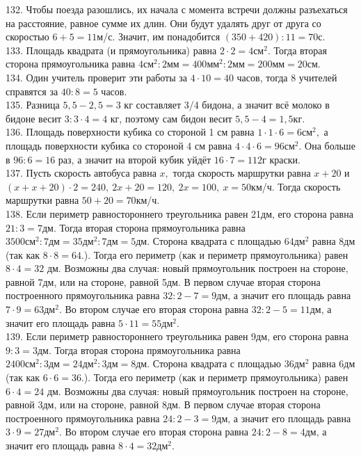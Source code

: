 \documentclass[12pt]{article}
\begin{document}
132. Чтобы поезда разошлись, их начала с момента встречи должны разъехаться на расстояние, равное сумме их длин. Они будут удалять друг от друга со скоростью $6+5=11$м/с. Значит, им понадобится $(350+420):11=70$с.\\
133. Площадь квадрата (и прямоугольника) равна $2\cdot2=4\text{см}^2.$ Тогда вторая сторона прямоугольника равна $4\text{см}^2:2\text{мм}=400\text{мм}^2:2\text{мм}=
200\text{мм}=20$см.\\
134. Один учитель проверит эти работы за $4\cdot10=40$ часов, тогда 8 учителей справятся за $40:8=5$ часов.\\
135. Разница $5,5-2,5=3$ кг составляет 3/4 бидона, а значит всё молоко в бидоне весит $3:3\cdot4=4$ кг, поэтому сам бидон весит $5,5-4=1,5$кг.\\
136. Площадь поверхности кубика со стороной 1 см равна $1\cdot1\cdot6=6\text{см}^2,$ а площадь поверхности кубика со стороной 4 см равна $4\cdot4\cdot6=96\text{см}^2.$ Она больше в $96:6=16$ раз, а значит на второй кубик уйдёт $16\cdot7=112$г краски.\\
137. Пусть скорость автобуса равна $x,$ тогда скорость маршрутки равна $x+20$ и $(x+x+20)\cdot2=240,\ 2x+20=120,\ 2x=100,\ x=50$км/ч. Тогда скорость маршрутки равна $50+20=70$км/ч.\\
138. Если периметр равностороннего треугольника равен 21дм, его сторона равна $21:3=7\text{дм}.$ Тогда вторая сторона прямоугольника равна $3500\text{см}^2:7\text{дм}=35\text{дм}^2:7\text{дм}=5\text{дм}$. Сторона квадрата с площадью $64\text{дм}^2$ равна 8дм (так как $8\cdot8=64.$). Тогда его периметр (как и периметр прямоугольника) равен $8\cdot4=32$ дм. Возможны два случая: новый прямоугольник построен на стороне, равной 7дм, или на стороне, равной 5дм. В первом случае вторая сторона построенного прямоугольника равна $32:2-7=9$дм, а значит его площадь равна $7\cdot9=63\text{дм}^2.$ Во втором случае его вторая сторона равна $32:2-5=11$дм, а значит его площадь равна $5\cdot11=55\text{дм}^2.$\\
139. Если периметр равностороннего треугольника равен 9дм, его сторона равна $9:3=3\text{дм}.$ Тогда вторая сторона прямоугольника равна $2400\text{см}^2:3\text{дм}=24\text{дм}^2:3\text{дм}=8\text{дм}$. Сторона квадрата с площадью $36\text{дм}^2$ равна 6дм (так как $6\cdot6=36.$). Тогда его периметр (как и периметр прямоугольника) равен $6\cdot4=24$ дм. Возможны два случая: новый прямоугольник построен на стороне, равной 3дм, или на стороне, равной 8дм. В первом случае вторая сторона построенного прямоугольника равна $24:2-3=9$дм, а значит его площадь равна $3\cdot9=27\text{дм}^2.$ Во втором случае его вторая сторона равна $24:2-8=4$дм, а значит его площадь равна $8\cdot4=32\text{дм}^2.$\\
\end{document}
